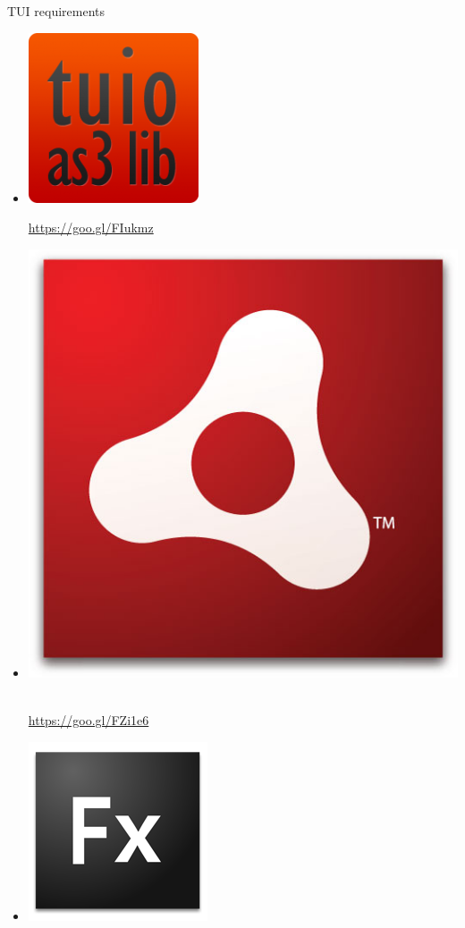 \begin{frame}%
\begin{block}{TUI requirements}
\begin{minipage}{1.0\linewidth}
\begin{itemize}
\item[] \includegraphics[scale=0.16]{images/tuioAS3.png}$\;$
\begin{scriptsize}
\url{https://goo.gl/FIukmz}
\end{scriptsize}%
\item[] \includegraphics[scale=0.06]{images/Adobe-Air.jpg}$\;$
\begin{scriptsize}
\url{https://goo.gl/FZi1e6}
\end{scriptsize}
\item[] \includegraphics[scale=0.16]{images/Fx_small.png}$\;$

\end{itemize}
\end{minipage}
\end{block}
\end{frame}
